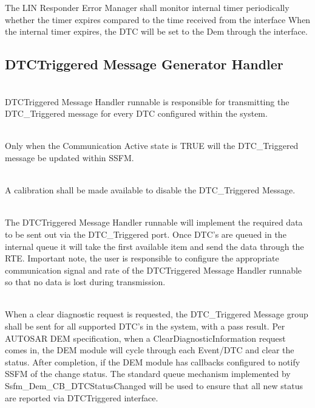 The LIN Responder Error Manager shall monitor internal timer periodically whether the timer expires compared to the time received from the interface 
When the internal timer expires, the DTC will be set to the Dem through the  interface.

{  }

\subsection{DTCTriggered Message Generator Handler}
\\
DTCTriggered Message Handler runnable is responsible for transmitting the DTC_Triggered message for every DTC configured within the system.
 
{    }

\\
Only when the Communication Active state is TRUE will the DTC_Triggered message be updated within SSFM.
{ }

\\
A calibration shall be made available to disable the DTC_Triggered Message.
{ }

\\
The DTCTriggered Message Handler runnable will implement the required data to be sent out via the DTC_Triggered port. Once DTC’s are queued in the internal queue it will take the first available item and send the data through the RTE. Important note, the user is responsible to configure the appropriate communication signal and rate of the DTCTriggered Message Handler runnable so that no data is lost during transmission.
{ }

\\
When a clear diagnostic request is requested, the DTC_Triggered Message group shall be sent for all supported DTC’s in the system, with a pass result. Per AUTOSAR DEM specification, when a ClearDiagnosticInformation request comes in, the DEM module will cycle through each Event/DTC and clear the status. After completion, if the DEM module has callbacks configured to notify SSFM of the change status. The standard queue mechanism implemented by Ssfm_Dem_CB_DTCStatusChanged will be used to ensure that all new status are reported via DTCTriggered interface.
{    }

